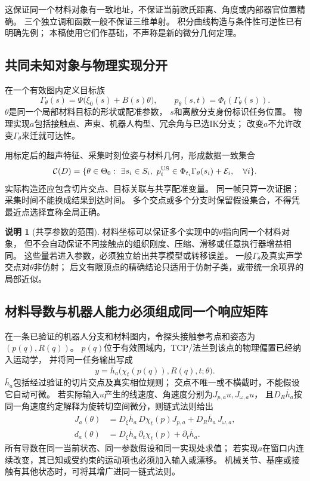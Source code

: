 \documentclass[11pt,a4paper]{article}
\numberwithin{equation}{section}
\theoremstyle{definition}
\newtheorem{remark}[theorem]{说明}
\newcommand{\C}{\mathcal C}
\begin{document}
这保证同一个材料对象有一致地址，不保证当前欧氏距离、角度或内部器官位置精确。
三个独立调和函数一般不保证三维单射。
积分曲线构造与条件性可逆性已有明确先例\cite{huynh2015}；
本稿使用它们作基础，不声称是新的微分几何定理。

\subsection{共同未知对象与物理实现分开}
在一个有效图内定义目标族
\begin{equation}
 \Gamma_\theta(s)=\Psi\big(\xi_0(s)+B(s)\theta\big),\qquad
 p_\theta(s,t)=\Phi_t(\Gamma_\theta(s)).
 \label{eq:latent}
\end{equation}
$\theta$是同一个局部材料目标的形状或配准参数，
$s$和离散分支身份标识任务位置。
物理实现$a$包括接触点、声束、机器人构型、冗余角与已选IK分支；
改变$a$不允许改变$\Gamma_\theta$来迁就可达性。

用标定后的超声特征、采集时刻位姿与材料几何，形成数据一致集合
\begin{equation}
 \C(D)=
 \{\theta\in\Theta_0:\ 
   \exists s_i\in S_i,\ 
   p_i^{\rm US}\in\Phi_{t_i}\Gamma_\theta(s_i)+\mathcal E_i,\quad\forall i\}.
 \label{eq:data}
\end{equation}
实际构造还应包含切片交点、目标关联与共享配准变量。
同一帧只算一次证据；采集时间不能换成结果到达时间。
多个交点或多个分支时保留假设集合，不得凭最近点选择宣称全局正确。

\begin{remark}[共享参数的范围]
材料坐标可以保证多个实现中的$\theta$指向同一个材料对象，
但不会自动保证不同接触点的组织刚度、压缩、滑移或任意执行器增益相同。
这些量若进入参数，必须独立给出共享模型或转移误差。
一般$\Gamma_\theta$及真实声学交点对$\theta$非仿射；
后文有限顶点的精确结论只适用于仿射子类，或带统一余项界的局部近似。
\end{remark}

\subsection{材料导数与机器人能力必须组成同一个响应矩阵}
在一条已验证的机器人分支和材料图内，令探头接触参考点和姿态为$(p(q),R(q))$。
$p(q)$位于有效图域内，TCP/法兰到该点的物理偏置已经纳入运动学，
并将同一任务输出写成
\[
 y=\bar h_a\bigl(\chi_t(p(q)),R(q),t;\theta\bigr).
\]
$\bar h_a$包括经过验证的切片交点及真实相位规则；
交点不唯一或不横截时，不能假设它自动可微。
若实际输入$u$产生的线速度、角速度分别为$J_{p,a}u,J_{\omega,a}u$，
且$D_R\bar h_a$按同一角速度约定解释为旋转切空间微分，则链式法则给出
\begin{align}
 J_a(\theta)
 &=D_\xi\bar h_a\,D\chi_t(p)J_{p,a}
   +D_R\bar h_a\,J_{\omega,a},\label{eq:coupled-jacobian}\\
 d_a(\theta)
 &=D_\xi\bar h_a\,\partial_t\chi_t(p)
   +\partial_t\bar h_a.\label{eq:coupled-drift}
\end{align}
所有导数在同一当前状态、同一参数假设和同一实现处求值；
若实现$a$在窗口内连续改变，其已知或受约束的运动项也必须加入输入或漂移。
机械关节、基座或接触有其他状态时，可将其增广进同一链式法则。
\end{document}
